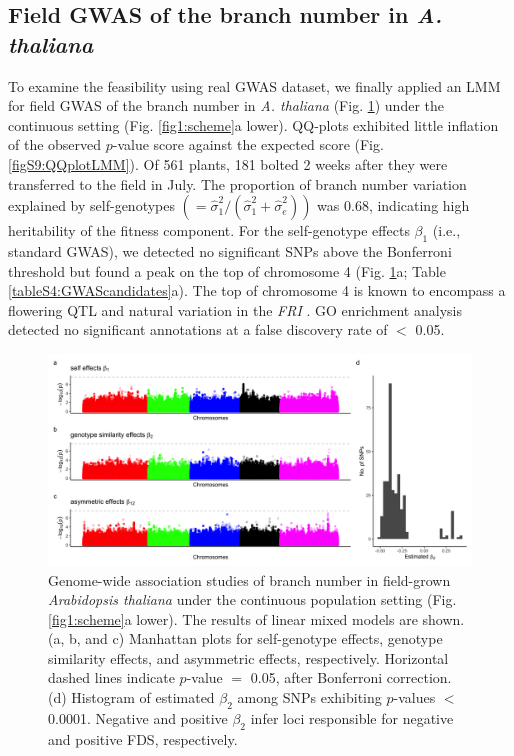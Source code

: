 \documentclass[12pt,]{article}
\begin{document}
\subsection{Field GWAS of the branch number in \textit{A. thaliana}}
To examine the feasibility using real GWAS dataset, we finally applied an LMM for field GWAS of the branch number in \textit{A. thaliana} (Fig. \ref{fig5:gwas}) under the continuous setting (Fig. \ref{fig1:scheme}a lower). QQ-plots exhibited little inflation of the observed $p$-value score against the expected score (Fig. \ref{figS9:QQplotLMM}). Of 561 plants, 181 bolted 2 weeks after they were transferred to the field in July. The proportion of branch number variation explained by self-genotypes $(=\hat{\sigma}^2_1/(\hat{\sigma}^2_1 + \hat{\sigma}^2_e))$ was 0.68, indicating high heritability of the fitness component. For the self-genotype effects $\beta_1$ (i.e., standard GWAS), we detected no significant SNPs above the Bonferroni threshold but found a peak on the top of chromosome 4 (Fig. \ref{fig5:gwas}a; Table \ref{tableS4:GWAScandidates}a). The top of chromosome 4 is known to encompass a flowering QTL and natural variation in the \textit{FRI} \citep{aranzana2005genome}. GO enrichment analysis detected no significant annotations at a false discovery rate of $<$ 0.05. 

\begin{figure}[ht]
  \includegraphics[width=\linewidth]{ManhattanLMM.png}
  \caption{Genome-wide association studies of branch number in field-grown \textit{Arabidopsis thaliana} under the continuous population setting (Fig. \ref{fig1:scheme}a lower). The results of linear mixed models are shown. (a, b, and c) Manhattan plots for self-genotype effects, genotype similarity effects, and asymmetric effects, respectively. Horizontal dashed lines indicate $p$-value $=$ 0.05, after Bonferroni correction. (d) Histogram of estimated $\beta_2$ among SNPs exhibiting $p$-values $<$ 0.0001. Negative and positive $\beta_2$ infer loci responsible for negative and positive FDS, respectively.}
  \label{fig5:gwas}
\end{figure}
\end{document}

